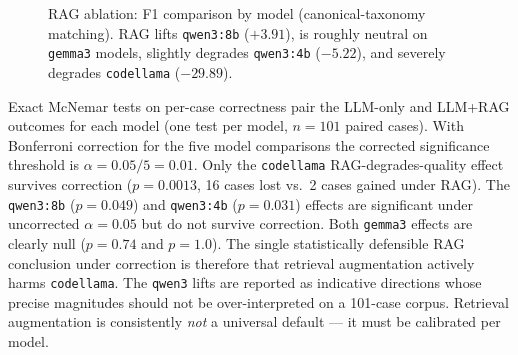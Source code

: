 \begin{figure}[H]
\centering
{}
\caption[RAG ablation: F1 comparison by model.]{RAG ablation: F1 comparison by model (canonical-taxonomy matching). RAG lifts \texttt{qwen3:8b} ($+3.91$), is roughly neutral on \texttt{gemma3} models, slightly degrades \texttt{qwen3:4b} ($-5.22$), and severely degrades \texttt{codellama} ($-29.89$).}
\label{fig:r1-rag-ablation}
\end{figure}

Exact McNemar tests on per-case correctness pair the LLM-only and LLM+RAG outcomes for each model (one test per model, $n=101$ paired cases). With Bonferroni correction for the five model comparisons the corrected significance threshold is $\alpha = 0.05/5 = 0.01$. Only the \texttt{codellama} RAG-degrades-quality effect survives correction ($p = 0.0013$, 16 cases lost vs.\ 2 cases gained under RAG). The \texttt{qwen3:8b} ($p = 0.049$) and \texttt{qwen3:4b} ($p = 0.031$) effects are significant under uncorrected $\alpha = 0.05$ but do not survive correction. Both \texttt{gemma3} effects are clearly null ($p = 0.74$ and $p = 1.0$). The single statistically defensible RAG conclusion under correction is therefore that retrieval augmentation actively harms \texttt{codellama}. The \texttt{qwen3} lifts are reported as indicative directions whose precise magnitudes should not be over-interpreted on a 101-case corpus. Retrieval augmentation is consistently \emph{not} a universal default --- it must be calibrated per model.


